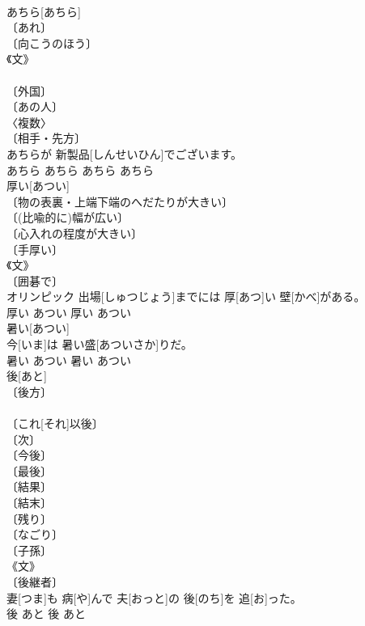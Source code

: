\documentclass[8pt]{extreport}
\begin{document}
\begin{CJK}{UTF8}{min}
\\	あちら[あちら]	
\\	〔あれ〕 
\\	〔向こうのほう〕 
\\	《文》 
\\	[⇒あっち] 
\\	〔外国〕 
\\	〔あの人〕 
\\	〈複数〉 
\\	〔相手・先方〕 
\\	あちらが 新製品[しんせいひん]でございます。	
\\	あちら	あちら	あちら	あちら	
\\	厚い[あつい]	
\\	〔物の表裏・上端下端のへだたりが大きい〕 
\\	〔(比喩的に)幅が広い〕 
\\	〔心入れの程度が大きい〕 
\\	〔手厚い〕 
\\	《文》 
\\	〔囲碁で〕 
\\	オリンピック 出場[しゅつじょう]までには 厚[あつ]い 壁[かべ]がある。	
\\	厚い	あつい	厚い	あつい	
\\	暑い[あつい]	
\\	今[いま]は 暑い盛[あついさか]りだ。	
\\	暑い	あつい	暑い	あつい	
\\	後[あと]	
\\	〔後方〕 
\\	[⇒うしろ] 
\\	〔これ[それ]以後〕 
\\	〔次〕 
\\	〔今後〕 
\\	〔最後〕 
\\	〔結果〕 
\\	〔結末〕 
\\	〔残り〕 
\\	〔なごり〕 
\\	〔子孫〕 
\\	《文》 
\\	〔後継者〕 
\\	[⇒あと２ 
\\	〔後妻〕 
\\	〔追加〕 
\\	〔(接続詞的に)それから〕 
\\	半年後[はんとしご] 妻[つま]も 病[や]んで 夫[おっと]の 後[のち]を 追[お]った。	
\\	後	あと	後	あと	

\end{CJK}
\end{document}
